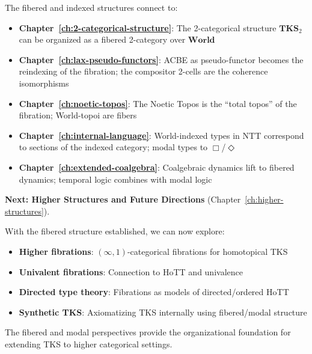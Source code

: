 \begin{remark}
\label{rem:meta-ch6-connections}
The fibered and indexed structures connect to:
\begin{itemize}
  \item \textbf{Chapter~\ref{ch:2-categorical-structure}}: The 2-categorical structure
        $\mathbf{TKS}_2$ can be organized as a fibered 2-category over $\mathbf{World}$
  \item \textbf{Chapter~\ref{ch:lax-pseudo-functors}}: ACBE as pseudo-functor becomes
        the reindexing of the fibration; the compositor 2-cells are the coherence
        isomorphisms
  \item \textbf{Chapter~\ref{ch:noetic-topos}}: The Noetic Topos is the ``total topos''
        of the fibration; World-topoi are fibers
  \item \textbf{Chapter~\ref{ch:internal-language}}: World-indexed types in NTT correspond
        to sections of the indexed category; modal types to $\Box$/$\Diamond$
  \item \textbf{Chapter~\ref{ch:extended-coalgebra}}: Coalgebraic dynamics lift to fibered
        dynamics; temporal logic combines with modal logic
\end{itemize}
\end{remark}

\begin{remark}
\label{rem:ch6-handoff}
\textbf{Next: Higher Structures and Future Directions} (Chapter~\ref{ch:higher-structures}).

With the fibered structure established, we can now explore:
\begin{itemize}
  \item \textbf{Higher fibrations}: $(\infty, 1)$-categorical fibrations for homotopical
        TKS
  \item \textbf{Univalent fibrations}: Connection to HoTT and univalence
  \item \textbf{Directed type theory}: Fibrations as models of directed/ordered HoTT
  \item \textbf{Synthetic TKS}: Axiomatizing TKS internally using fibered/modal structure
\end{itemize}
The fibered and modal perspectives provide the organizational foundation for
extending TKS to higher categorical settings.
\end{remark}

